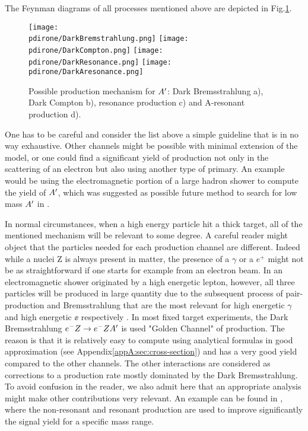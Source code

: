 The Feynman diagrams of all processes mentioned above are depicted in Fig.\ref{fig:dm-production-mechanism}.

\begin{figure}
\centering
\texttt{[image: \\pdirone/DarkBremstrahlung.png]}
\texttt{[image: \\pdirone/DarkCompton.png]}
\texttt{[image: \\pdirone/DarkResonance.png]}
\texttt{[image: \\pdirone/DarkAresonance.png]}
\caption{Possible production mechanism for $A'$: Dark Bremsstrahlung a), Dark Compton b), resonance production c) and A-resonant production d).}
\label{fig:dm-production-mechanism}
\end{figure}

One has to be careful and consider the list above a simple guideline that is in no way exhaustive. Other channels might be possible with minimal extension of the model, or one could find a significant yield of production not only in the scattering of an electron but also using another type of primary. An example would be using the electromagnetic portion of a large hadron shower to compute the yield of $A'$, which was suggested as possible future method to search for low mass $A'$ in \cite{Celentano:2020vtu}.

In normal circumstances, when a high energy particle hit a thick target, all of the mentioned mechanism will be relevant to some degree. A careful reader might object that the particles needed for each production channel are different. Indeed while a nuclei Z is always present in matter, the presence of a $\gamma$ or a $e^+$ might not be as straightforward if one starts for example from an electron beam. In an electromagnetic shower originated by a high energetic lepton, however, all three particles will be produced in large quantity due to the subsequent process of pair-production and Bremsstrahlung that are the most relevant for high energetic $\gamma$ and high energetic $\ee$ respectively \cite{Bichsel:2002cf}. In most fixed target experiments, the Dark Bremsstrahlung $e^- Z \to e^- Z A'$ is used "Golden Channel" of production. The reason is that it is relatively easy to compute using analytical formulas in good approximation (see Appendix\ref{appA:sec:cross-section}) and has a very good yield compared to the other channels. The other interactions are considered as corrections to a production rate mostly dominated by the Dark Bremsstrahlung. To avoid confusion in the reader, we also admit here that an appropriate analysis might make other contributions very relevant. An example can be found in \cite{Marsicano_2018}, where the non-resonant and resonant production are used to improve significantly the signal yield for a specific mass range.

